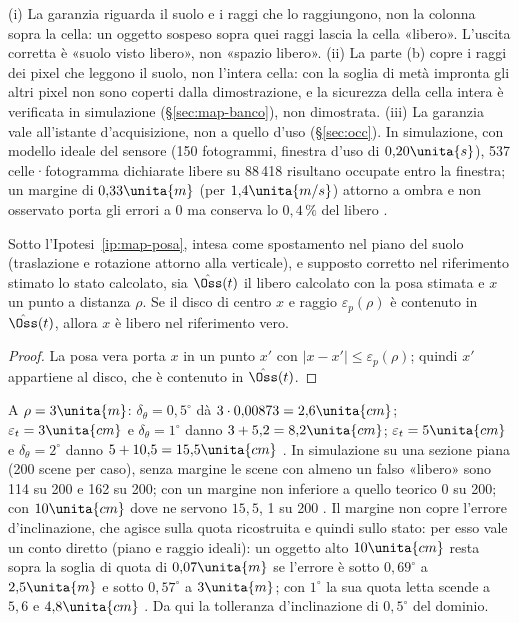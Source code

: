 \begin{osservazione}\label{oss:map-nondice}
(i) La garanzia riguarda il suolo e i raggi che lo raggiungono, non la colonna sopra la cella: un oggetto sospeso sopra quei raggi lascia la cella «libero». L'uscita corretta è «suolo visto libero», non «spazio libero». (ii) La parte (b) copre i raggi dei pixel che leggono il suolo, non l'intera cella: con la soglia di metà impronta gli altri pixel non sono coperti dalla dimostrazione, e la sicurezza della cella intera è verificata in simulazione (\S\ref{sec:map-banco}), non dimostrata. (iii) La garanzia vale all'istante d'acquisizione, non a quello d'uso (\S\ref{sec:occ}). In simulazione, con modello ideale del sensore (150 fotogrammi, finestra d'uso di $0{,}20\unita{s}$), 537 celle·fotogramma dichiarate libere su 88\,418 risultano occupate entro la finestra; un margine di $0{,}33\unita{m}$ (per $1{,}4\unita{m/s}$) attorno a ombra e non osservato porta gli errori a 0 ma conserva lo $0{,}4\,\%$ del libero .
\end{osservazione}

\begin{lemma}\label{lem:map-posa}
Sotto l'Ipotesi~\ref{ip:map-posa}, intesa come spostamento nel piano del suolo (traslazione e rotazione attorno alla verticale), e supposto corretto nel riferimento stimato lo stato calcolato, sia $\hat{\Oss}(t)$ il libero calcolato con la posa stimata e $x$ un punto a distanza $\rho$. Se il disco di centro $x$ e raggio $\varepsilon_p(\rho)$ è contenuto in $\hat{\Oss}(t)$, allora $x$ è libero nel riferimento vero.
\end{lemma}
\begin{proof} La posa vera porta $x$ in un punto $x'$ con $|x-x'|\le\varepsilon_p(\rho)$; quindi $x'$ appartiene al disco, che è contenuto in $\hat{\Oss}(t)$.\end{proof}
A $\rho=3\unita{m}$: $\delta_\theta=0{,}5^\circ$ dà $3\cdot0{,}00873=2{,}6\unita{cm}$; $\varepsilon_t=3\unita{cm}$ e $\delta_\theta=1^\circ$ danno $3+5{,}2=8{,}2\unita{cm}$; $\varepsilon_t=5\unita{cm}$ e $\delta_\theta=2^\circ$ danno $5+10{,}5=15{,}5\unita{cm}$ . In simulazione su una sezione piana (200 scene per caso), senza margine le scene con almeno un falso «libero» sono 114 su 200 e 162 su 200; con un margine non inferiore a quello teorico 0 su 200; con $10\unita{cm}$ dove ne servono $15{,}5$, 1 su 200 . Il margine non copre l'errore d'inclinazione, che agisce sulla quota ricostruita e quindi sullo stato: per esso vale un conto diretto (piano e raggio ideali): un oggetto alto $10\unita{cm}$ resta sopra la soglia di quota di $0{,}07\unita{m}$ se l'errore è sotto $0{,}69^\circ$ a $2{,}5\unita{m}$ e sotto $0{,}57^\circ$ a $3\unita{m}$; con $1^\circ$ la sua quota letta scende a $5{,}6$ e $4{,}8\unita{cm}$ . Da qui la tolleranza d'inclinazione di $0{,}5^\circ$ del dominio.

